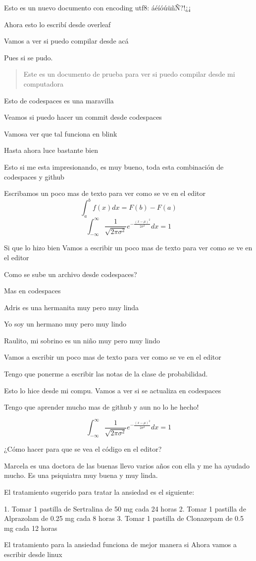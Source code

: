 \documentclass{article}
\begin{document}
	
	Esto es un nuevo documento con encoding utf8: áéíóúüñÑ?!¿¡

 Ahora esto lo escribí desde overleaf
 
 Vamos a ver si puedo compilar desde acá

 Pues si se pudo.

 \begin{abstract}
	Este es un documento de prueba para ver si puedo compilar desde mi computadora
 \end{abstract}

 Esto de codespaces es una maravilla


Veamos si puedo hacer un commit desde codespaces

Vamosa ver que tal funciona en blink


Hasta ahora luce bastante bien

Esto si me esta impresionando, es muy bueno, toda esta combinación de codespaces y github

Escribamos un poco mas de texto para ver como se ve en el editor
\begin{equation}
	\int_{a}^{b} f(x) dx = F(b) - F(a)
\end{equation}
\begin{equation}
	\int_{-\infty}^{\infty} \frac{1}{\sqrt{2\pi\sigma^2}} e^{-\frac{(x-\mu)^2}{2\sigma^2}} dx = 1
\end{equation}

Si que lo hizo bien
Vamos a escribir un poco mas de texto para ver como se ve en el editor


Como se sube un archivo desde codespaces?

Mas en codespaces

Adris es una hermanita muy pero muy linda

Yo soy un hermano muy pero muy lindo

Raulito, mi sobrino es un niño muy pero muy lindo

Vamos a escribir un poco mas de texto para ver como se ve en el editor

Tengo que ponerme a escribir las notas de la clase de probabilidad.

Esto lo hice desde mi compu. Vamos a ver si se actualiza en codespaces


Tengo que aprender mucho mas de github y aun no lo he hecho!

$$
\int_{-\infty}^{\infty} \frac{1}{\sqrt{2\pi\sigma^2}} e^{-\frac{(x-\mu)^2}{2\sigma^2}} dx = 1
$$

¿Cómo hacer para que se vea el código en el editor?


Marcela es una doctora de las buenas llevo varios años con ella y me ha ayudado mucho. Es una psiquiatra muy buena y muy linda.



El tratamiento sugerido para tratar la ansiedad es el siguiente:

1. Tomar 1 pastilla de Sertralina de 50 mg cada 24 horas
2. Tomar 1 pastilla de Alprazolam de 0.25 mg cada 8 horas
3. Tomar 1 pastilla de Clonazepam de 0.5 mg cada 12 horas

El tratamiento para la ansiedad funciona de mejor manera si 
Ahora vamos a escribir desde linux
\end{document}
